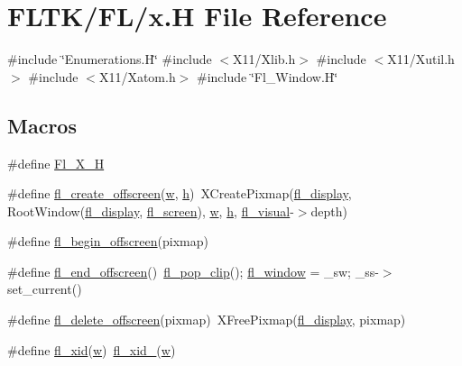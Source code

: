\hypertarget{x_8_h}{}\section{F\+L\+T\+K/\+F\+L/x.H File Reference}
\label{x_8_h}
{\ttfamily \#include \char`\"{}Enumerations.\+H\char`\"{}}\newline
{\ttfamily \#include $<$X11/\+Xlib.\+h$>$}\newline
{\ttfamily \#include $<$X11/\+Xutil.\+h$>$}\newline
{\ttfamily \#include $<$X11/\+Xatom.\+h$>$}\newline
{\ttfamily \#include \char`\"{}Fl\+\_\+\+Window.\+H\char`\"{}}\newline
\subsection*{Macros}
\begin{DoxyCompactItemize}
\item 
\#define \hyperlink{x_8_h_ad8edb41ff822d7ac6de0cc3902f24489}{Fl\+\_\+\+X\+\_\+H}
\item 
\#define \hyperlink{x_8_h_ac052986a562eabf83386c3f2a209954d}{fl\+\_\+create\+\_\+offscreen}(\hyperlink{forms_8_h_aac374e320caaadeca4874add33b62af2}{w},  \hyperlink{forms_8_h_a7e427ba5b307f9068129699250690066}{h})~X\+Create\+Pixmap(\hyperlink{x_8_h_ae4842a1fc7d2d7b95afeaba5611fc426}{fl\+\_\+display}, Root\+Window(\hyperlink{x_8_h_ae4842a1fc7d2d7b95afeaba5611fc426}{fl\+\_\+display}, \hyperlink{x_8_h_a42a55d8c59138d9f0fa899491c25560c}{fl\+\_\+screen}), \hyperlink{forms_8_h_aac374e320caaadeca4874add33b62af2}{w}, \hyperlink{forms_8_h_a7e427ba5b307f9068129699250690066}{h}, \hyperlink{x_8_h_abe861b6ba1d71b2f73e3883c10ac5c27}{fl\+\_\+visual}-\/$>$depth)
\item 
\#define \hyperlink{x_8_h_a3c731ad1bba67a9e40f91e23d10eb884}{fl\+\_\+begin\+\_\+offscreen}(pixmap)
\item 
\#define \hyperlink{x_8_h_a51101df672706fe822b8c913e8e4f588}{fl\+\_\+end\+\_\+offscreen}()~\hyperlink{group__fl__drawings_ga7abb216a9a87408c8926126cc9efce22}{fl\+\_\+pop\+\_\+clip}(); \hyperlink{x_8_h_afdab6664143864c36ba6b51782b32500}{fl\+\_\+window} = \+\_\+sw; \+\_\+ss-\/$>$set\+\_\+current()
\item 
\#define \hyperlink{x_8_h_a12a5792a2cfdb5b4f46e0b5b5ef67cf5}{fl\+\_\+delete\+\_\+offscreen}(pixmap)~X\+Free\+Pixmap(\hyperlink{x_8_h_ae4842a1fc7d2d7b95afeaba5611fc426}{fl\+\_\+display}, pixmap)
\item 
\#define \hyperlink{x_8_h_a0b95b4c3159c51c43ec553b1959d5b75}{fl\+\_\+xid}(\hyperlink{forms_8_h_aac374e320caaadeca4874add33b62af2}{w})~\hyperlink{x_8_h_a4daabfb0d38b46de684f3d88af173299}{fl\+\_\+xid\+\_\+}(\hyperlink{forms_8_h_aac374e320caaadeca4874add33b62af2}{w})
\end{DoxyCompactItemize}
